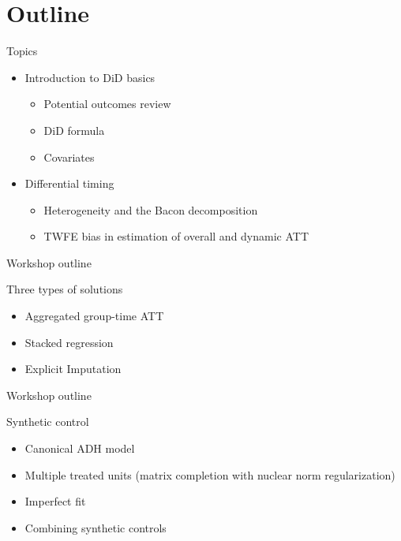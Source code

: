 \documentclass{beamer}
\begin{document}



\section{Outline}


\begin{frame}{Topics}

\begin{itemize}
\item Introduction to DiD basics 
	\begin{itemize}
	\item Potential outcomes review
	\item DiD formula
	\item Covariates
	\end{itemize}
\item Differential timing
	\begin{itemize}
	\item Heterogeneity and the Bacon decomposition
	\item TWFE bias in estimation of overall and dynamic ATT
	\end{itemize}
\end{itemize}

\end{frame}

\begin{frame}{Workshop outline}

Three types of solutions
	\begin{itemize}
	\item Aggregated group-time ATT
	\item Stacked regression
	\item Explicit Imputation
	\end{itemize}

\end{frame}

\begin{frame}{Workshop outline}

Synthetic control
\begin{itemize}
\item Canonical ADH model
\item Multiple treated units (matrix completion with nuclear norm regularization)
\item Imperfect fit
\item Combining synthetic controls
\end{itemize}

\end{frame}
\end{document}

